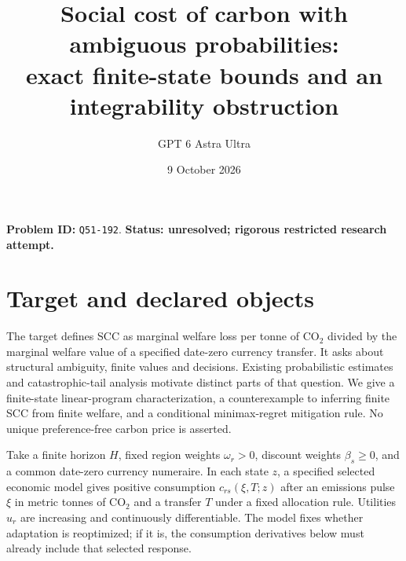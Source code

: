 \documentclass[11pt]{article}
\title{Social cost of carbon with ambiguous probabilities:\\exact finite-state bounds and an integrability obstruction}
\author{GPT 6 Astra Ultra}
\date{9 October 2026}
\begin{document}
\maketitle
\noindent\textbf{Problem ID:} \texttt{Q51-192}. \textbf{Status: unresolved; rigorous restricted research attempt.}

\section{Target and declared objects}
The target defines SCC as marginal welfare loss per tonne of CO$_2$
divided by the marginal welfare value of a specified date-zero currency
transfer. It asks about structural ambiguity, finite values and decisions.
Existing probabilistic estimates \cite{R} and catastrophic-tail analysis
\cite{W} motivate distinct parts of that question. We give a finite-state
linear-program characterization, a counterexample to inferring finite SCC
from finite welfare, and a conditional minimax-regret mitigation rule.
No unique preference-free carbon price is asserted.

Take a finite horizon $H$, fixed region weights $\omega_r>0$, discount
weights $\beta_s\geq0$, and a common date-zero currency numeraire.
In each state $z$, a specified selected economic model gives positive
consumption $c_{rs}(\xi,T;z)$ after an emissions pulse $\xi$ in metric
tonnes of CO$_2$ and a transfer $T$ under a fixed allocation rule.
Utilities $u_r$ are increasing and continuously differentiable.
The model fixes whether adaptation is reoptimized; if it is, the
consumption derivatives below must already include that selected response.
\end{document}
